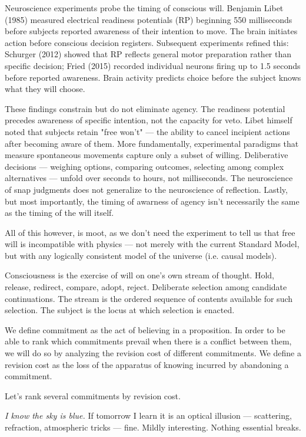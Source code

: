 Neuroscience experiments probe the timing of conscious will. Benjamin Libet (1985) measured electrical readiness potentials (RP) beginning 550 milliseconds before subjects reported awareness of their intention to move. The brain initiates action before conscious decision registers. Subsequent experiments refined this: Schurger (2012) showed that RP reflects general motor preparation rather than specific decision; Fried (2015) recorded individual neurons firing up to 1.5 seconds before reported awareness. Brain activity predicts choice before the subject knows what they will choose.

These findings constrain but do not eliminate agency. The readiness potential precedes awareness of specific intention, not the capacity for veto. Libet himself noted that subjects retain "free won't" — the ability to cancel incipient actions after becoming aware of them. More fundamentally, experimental paradigms that measure spontaneous movements capture only a subset of willing. Deliberative decisions — weighing options, comparing outcomes, selecting among complex alternatives — unfold over seconds to hours, not milliseconds. The neuroscience of snap judgments does not generalize to the neuroscience of reflection. Lastly, but most importantly, the timing of awarness of agency isn't necessarily the same as the timing of the will itself. 

All of this however, is moot, as we don't need the experiment to tell us that free will is incompatible with physics — not merely with the current Standard Model, but with any logically consistent model of the universe (i.e. causal models).

Consciousness is the exercise of will on one's own stream of thought. Hold, release, redirect, compare, adopt, reject. Deliberate selection among candidate continuations. The stream is the ordered sequence of contents available for such selection. The subject is the locus at which selection is enacted.

We define commitment as the act of believing in a proposition. In order to be able to rank which commitments prevail when there is a conflict between them, we will do so by analyzing the revision cost of different commitments. We define a revision cost as the loss of the apparatus of knowing incurred by abandoning a commitment.

Let's rank several commitments by revision cost.

\medskip

\textit{I know the sky is blue.} If tomorrow I learn it is an optical illusion — scattering, refraction, atmospheric tricks — fine. Mildly interesting. Nothing essential breaks.

